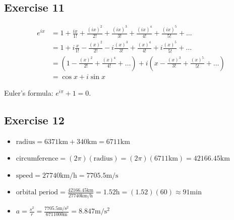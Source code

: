 \documentclass[11pt]{article}
\begin{document}
\subsection{Exercise 11}

\begin{align*}
e^{ix} &= 1 + \frac{ix}{1!} + \frac{(ix)^2}{2!} + \frac{(ix)^3}{3!} + \frac{(ix)^4}{4!} + \frac{(ix)^5}{5!} + \dots \\
&= 1 + i\frac{x}{1!} - \frac{(x)^2}{2!} - i\frac{(x)^3}{3!} + \frac{(x)^4}{4!} + i\frac{(x)^5}{5!} + \dots \\
&= (1 - \frac{(x)^2}{2!} + \frac{(x)^4}{4!} + \dots{}) + i(x - \frac{(x)^3}{3!} + \frac{(x)^5}{5!} + \dots) \\
&= \cos x + i \sin x
\end{align*}

Euler's formula: $e^{i \pi}+ 1 = 0$.

\subsection{Exercise 12}

\begin{itemize}
	\item $\text{radius} = 6371\text{km} + 340\text{km} = 6711\text{km}$
	\item $\text{circumference} = (2\pi)(\text{radius}) = (2\pi)(6711\text{km}) = 42166.45\text{km}$
	\item $\text{speed} = 27740\text{km/h} = 7705.5\text{m/s}$
	\item $\text{orbital period} = \frac{42166.45\text{km}}{27740\text{km/h}} = 1.52\text{h} = (1.52)(60) \approx 91\text{min}$
	\item $a = \frac{s^2}{r} = \frac{7705.5 \text{m}/\text{s}^2}{6711000\text{m}} = 8.847\text{m}/\text{s}^2$
\end{itemize}
\end{document}
